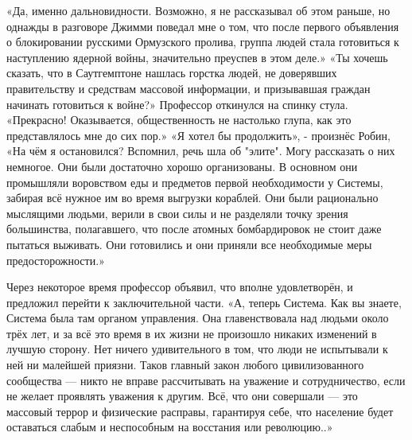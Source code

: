 \documentclass[a4paper,12pt]{book}
\begin{document}
	«Да, именно дальновидности. Возможно, я не рассказывал об этом раньше, но однажды в разговоре Джимми поведал мне о том, что после первого объявления о блокировании русскими Ормузского пролива, группа людей стала готовиться к наступлению ядерной войны, значительно преуспев в этом деле.»
	«Ты хочешь сказать, что в Саутгемптоне нашлась горстка людей, не доверявших правительству и средствам массовой информации, и призывавшая граждан начинать готовиться к войне?»
	Профессор откинулся на спинку стула.
	«Прекрасно! Оказывается, общественность не настолько глупа, как это представлялось мне до сих пор.»
	«Я хотел бы продолжить», - произнёс Робин,
	«На чём я остановился? Вспомнил, речь шла об "элите". Могу рассказать о них немногое. Они были достаточно хорошо организованы. В основном они промышляли воровством еды и предметов первой необходимости у Системы, забирая всё нужное им во время выгрузки кораблей. Они были рационально мыслящими людьми, верили в свои силы и не разделяли точку зрения большинства, полагавшего, что после атомных бомбардировок не стоит даже пытаться выживать. Они готовились и они приняли все необходимые меры предосторожности.»

	Через некоторое время профессор объявил, что вполне удовлетворён, и предложил перейти к заключительной части.
	«А, теперь Система. Как вы знаете, Система была там органом управления. Она главенствовала над людьми около трёх лет, и за всё это время в их жизни не произошло никаких изменений в лучшую сторону. Нет ничего удивительного в том, что люди не испытывали к ней ни малейшей приязни. Таков главный закон любого цивилизованного сообщества — никто не вправе рассчитывать на уважение и сотрудничество, если не желает проявлять уважения к другим. Всё, что они совершали — это массовый террор и физические расправы, гарантируя себе, что население будет оставаться слабым и неспособным на восстания или революцию..»
\end{document}
